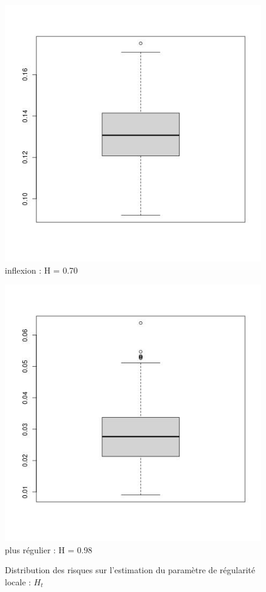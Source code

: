 \begin{figure}[H]
\begin{minipage}{0.32\linewidth}
		\includegraphics[width=\textwidth]{Images/regularite_qualite_estimation/N200_lbd180_box6_2.jpg}
		inflexion : H = 0.70
	\end{minipage}
	\begin{minipage}{0.32\linewidth}
		\centering
		\includegraphics[width=\textwidth]{Images/regularite_qualite_estimation/N200_lbd180_box8_2.jpg}
		plus régulier : H = 0.98
	\end{minipage}
	\caption{Distribution des risques sur l'estimation du paramètre de régularité locale : $H_t$}
	\label{fig:H_error_boxplot}
\end{figure}

